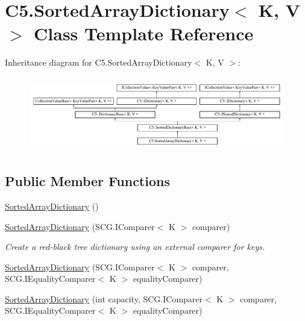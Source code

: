 \hypertarget{class_c5_1_1_sorted_array_dictionary}{}\section{C5.\+Sorted\+Array\+Dictionary$<$ K, V $>$ Class Template Reference}
\label{class_c5_1_1_sorted_array_dictionary}
Inheritance diagram for C5.\+Sorted\+Array\+Dictionary$<$ K, V $>$\+:\begin{figure}[H]
\begin{center}
\leavevmode
\includegraphics[height=3.286385cm]{class_c5_1_1_sorted_array_dictionary}
\end{center}
\end{figure}
\subsection*{Public Member Functions}
\begin{DoxyCompactItemize}
\item 
\hyperlink{class_c5_1_1_sorted_array_dictionary_a12acb19061b7eeaf089de542d5b59ab8}{Sorted\+Array\+Dictionary} ()
\item 
\hyperlink{class_c5_1_1_sorted_array_dictionary_a871b5998b41576d630fd954353a76698}{Sorted\+Array\+Dictionary} (S\+C\+G.\+I\+Comparer$<$ K $>$ comparer)
\begin{DoxyCompactList}\small\item\em Create a red-\/black tree dictionary using an external comparer for keys. \end{DoxyCompactList}\item 
\hyperlink{class_c5_1_1_sorted_array_dictionary_abb72ad06da6c56f259934f50b270ff46}{Sorted\+Array\+Dictionary} (S\+C\+G.\+I\+Comparer$<$ K $>$ comparer, S\+C\+G.\+I\+Equality\+Comparer$<$ K $>$ equality\+Comparer)
\item 
\hyperlink{class_c5_1_1_sorted_array_dictionary_a377af5e5a02c370883ffa9aa87f198b0}{Sorted\+Array\+Dictionary} (int capacity, S\+C\+G.\+I\+Comparer$<$ K $>$ comparer, S\+C\+G.\+I\+Equality\+Comparer$<$ K $>$ equality\+Comparer)
\end{DoxyCompactItemize}
